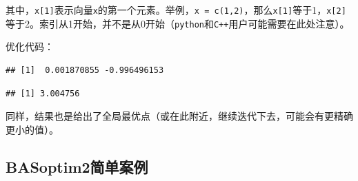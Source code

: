 \documentclass[]{ctexbook}
\newenvironment{Shaded}{\begin{snugshade}}{\end{snugshade}}
\newcommand{\KeywordTok}[1]{\textcolor[rgb]{0.13,0.29,0.53}{\textbf{#1}}}
\newcommand{\DataTypeTok}[1]{\textcolor[rgb]{0.13,0.29,0.53}{#1}}
\newcommand{\DecValTok}[1]{\textcolor[rgb]{0.00,0.00,0.81}{#1}}
\newcommand{\StringTok}[1]{\textcolor[rgb]{0.31,0.60,0.02}{#1}}
\newcommand{\OtherTok}[1]{\textcolor[rgb]{0.56,0.35,0.01}{#1}}
\newcommand{\OperatorTok}[1]{\textcolor[rgb]{0.81,0.36,0.00}{\textbf{#1}}}
\newcommand{\NormalTok}[1]{#1}
\theoremstyle{definition}
\theoremstyle{definition}
\theoremstyle{definition}
\theoremstyle{remark}
\begin{document}
其中，\texttt{x{[}1{]}}表示向量\texttt{x}的第一个元素。举例，\texttt{x\ =\ c(1,2)}，那么\texttt{x{[}1{]}}等于1，\texttt{x{[}2{]}}等于2。索引从1开始，并不是从0开始（\texttt{python}和\texttt{C++}用户可能需要在此处注意）。

优化代码：

\begin{Shaded}
\end{Shaded}

\begin{verbatim}
## [1]  0.001870855 -0.996496153
\end{verbatim}

\begin{Shaded}
\end{Shaded}

\begin{verbatim}
## [1] 3.004756
\end{verbatim}

同样，结果也是给出了全局最优点（或在此附近，继续迭代下去，可能会有更精确更小的值）。

\subsection{BASoptim2简单案例}\label{BAS2examples}
\end{document}
